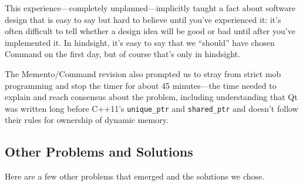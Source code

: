 \documentclass{article}
\begin{document}
This experience---completely unplanned---implicitly taught a fact about
software design that is easy to say but hard to believe until you've
experienced it: it's often difficult to tell whether a design idea will be
good or bad until after you've implemented it. In hindsight, it's easy to say
that we ``should'' have chosen Command on the first day, but of course that's
only in hindsight. 

The Memento/Command revision also prompted us to stray from strict mob
programming and stop the timer for about 45 minutes---the time needed to
explain and reach consensus about the problem, including understanding that Qt
was written long before C++11's \texttt{unique\_ptr} and \texttt{shared\_ptr}
and doesn't follow their rules for ownership of dynamic memory.



\begin{comment}
``common knowledge''

The day I improvised a lecture on agile vs. waterfall. Previous exposure had
given some students the impression that agile is hopelessly high-risk
because it has no discipline and other
students the impression that waterfall is hopelessly high-risk because it's
inflexible and assumes perfect forethought.

Some students had previous experience with Git and some did not.

No textbooks.

Hard to teach, easy to teach.

Danger: what if a prima donna shows up?

quiet students not asking questions, not having their problems addressed---not
a problem now
\end{comment}

\subsection{Other Problems and Solutions}

Here are a few other problems that emerged and the solutions we chose.
\end{document}
